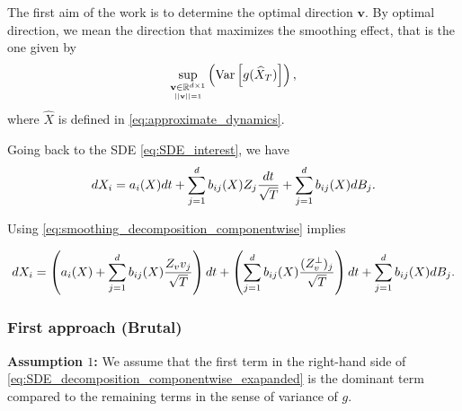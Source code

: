 The first aim of the work is to determine the optimal direction $\mathbf{v}$. By optimal direction, we mean the direction that maximizes the smoothing effect, that is the one given by
\begin{align}\label{optimality_criterion_2}
\underset{\underset{\mid \mid \mathbf{v}\mid \mid=1} {\mathbf{v} \in \mathbb{R}^{d \times 1}}}{\operatorname{\sup}} \left(\text{Var}\left[ g(\widehat{X}_T) \right] \right) ,
\end{align}
where $\hat{X}$ is defined in \eqref{eq:approximate_dynamics}.


Going back to the SDE \eqref{eq:SDE_interest}, we have 
\begin{equation}
dX_i=a_i(X) dt +\sum_{j=1}^d b_{ij}(X) Z_j \frac{dt}{\sqrt{T}}+\sum_{j=1}^d b_{ij}(X) dB_j .
\end{equation}

Using \eqref{eq:smoothing_decomposition_componentwise} implies

\begin{equation}\label{eq:SDE_decomposition_componentwise_exapanded}
dX_i=\left(a_i(X)+\sum_{j=1}^d b_{ij}(X)  \frac{Z_v v_j}{\sqrt{T}}\right) dt+\left(\sum_{j=1}^d b_{ij}(X) \frac{(Z_v^\perp)_j}{\sqrt{T}}\right) dt +\sum_{j=1}^d b_{ij}(X) dB_j .
\end{equation}

\subsubsection{First approach (Brutal)}

\textbf{Assumption $1$:} We assume that the first term in the right-hand side of \eqref{eq:SDE_decomposition_componentwise_exapanded}  is the dominant term compared to the remaining terms in the sense of variance of $g$.



